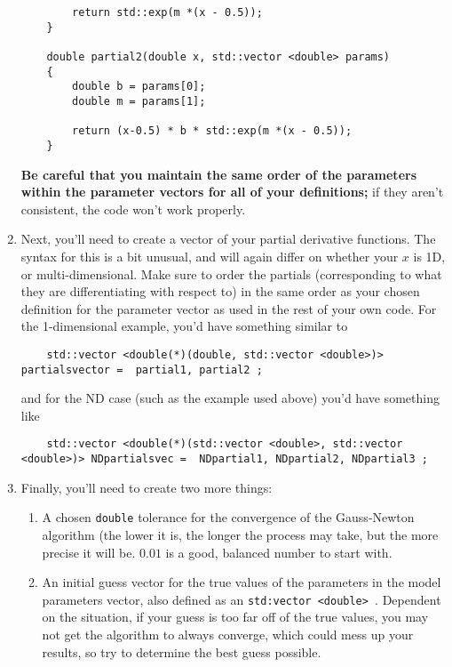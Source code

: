 \documentclass[12pt]{article}
\begin{document}
\begin{enumerate}
\begin{lstlisting}
		return std::exp(m *(x - 0.5));	
	}
	
	double partial2(double x, std::vector <double> params)
	{
		double b = params[0];
		double m = params[1];
			
		return (x-0.5) * b * std::exp(m *(x - 0.5));	
	}
	\end{lstlisting}
	
	\textbf{Be careful that you maintain the same order of the parameters within the parameter vectors for all of your definitions;} if they aren't consistent, the code won't work properly.
	\newpage
	\item Next, you'll need to create a vector of your partial derivative functions. The syntax for this is a bit unusual, and will again differ on whether your $x$ is 1D, or multi-dimensional. Make sure to order the partials (corresponding to what they are differentiating with respect to) in the same order as your chosen definition for the parameter vector as used in the rest of your own code. For the 1-dimensional example, you'd have something similar to 
	\begin{lstlisting}
	std::vector <double(*)(double, std::vector <double>)> partialsvector =  partial1, partial2 ;
	\end{lstlisting}
	and for the ND case (such as the example used above) you'd have something like
	\begin{lstlisting}
	std::vector <double(*)(std::vector <double>, std::vector <double>)> NDpartialsvec =  NDpartial1, NDpartial2, NDpartial3 ;
	\end{lstlisting}
	\item Finally, you'll need to create two more things: 
	\begin{enumerate}
		\item A chosen \texttt{double} tolerance for the convergence of the Gauss-Newton algorithm (the lower it is, the longer the process may take, but the more precise it will be. $0.01$ is a good, balanced number to start with.
		\item An initial guess vector for the true values of the parameters in the model parameters vector, also defined as an \texttt{std:vector <double> }. Dependent on the situation, if your guess is too far off of the true values, you may not get the algorithm to always converge, which could mess up your results, so try to determine the best guess possible.
	\end{enumerate}

\end{enumerate}
\end{document}

